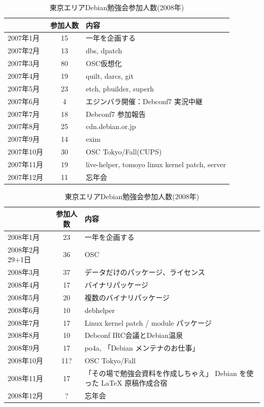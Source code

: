 \documentclass[mingoth,a4paper]{jsarticle}
\begin{document}
\begin{table}[t]
\begin{minipage}{0.5\hsize}
 \caption{東京エリアDebian勉強会参加人数(2007年)}\label{tab:count2007}
 \begin{center}
  \begin{tabular}{|l|c|p{10em}|}
 \hline
 & 参加人数 & 内容\\
 \hline
2007年1月 & 15 & 一年を企画する \\
2007年2月 & 13 & dbs, dpatch\\ 
2007年3月 & 80 & OSC仮想化 \\
2007年4月 & 19 & quilt, darcs, git\\
2007年5月 & 23 & etch, pbuilder, superh \\   
2007年6月 & 4 & エジンバラ開催：Debconf7 実況中継 \\
2007年7月 & 18 & Debconf7 参加報告\\
2007年8月 & 25 & cdn.debian.or.jp \\   
2007年9月 & 14 & exim \\   
2007年10月 & 30 & OSC Tokyo/Fall(CUPS) \\   
2007年11月 & 19 & live-helper, tomoyo linux kernel patch, server\\
2007年12月 & 11 & 忘年会\\
 \hline
  \end{tabular}
 \end{center}
\end{minipage}
\begin{minipage}{0.5\hsize}
 \caption{東京エリアDebian勉強会参加人数(2008年)}\label{tab:count2008}
 \begin{center}
  \begin{tabular}{|l|c|p{10em}|}
 \hline
 & 参加人数 & 内容\\
 \hline
2008年1月 & 23 & 一年を企画する \\
2008年2月29+1日 & 36 & OSC  \\
2008年3月 & 37 & データだけのパッケージ、ライセンス \\
2008年4月 & 17 & バイナリパッケージ \\
2008年5月 & 20 & 複数のバイナリパッケージ \\
2008年6月 & 10 & debhelper \\
2008年7月 & 17 & Linux kernel patch / module パッケージ \\
2008年8月 & 10 & Debconf IRC会議とDebian温泉 \\
2008年9月 & 17 & po4a, 「Debian メンテナのお仕事」 \\
2008年10月 & 11? & OSC Tokyo/Fall \\
2008年11月 & 17 & 「その場で勉強会資料を作成しちゃえ」 Debian を使った \LaTeX{} 原稿作成合宿 \\
2008年12月 & ? & 忘年会 \\
 \hline
  \end{tabular}
 \end{center}
\end{minipage}
\end{table}
\end{document}
